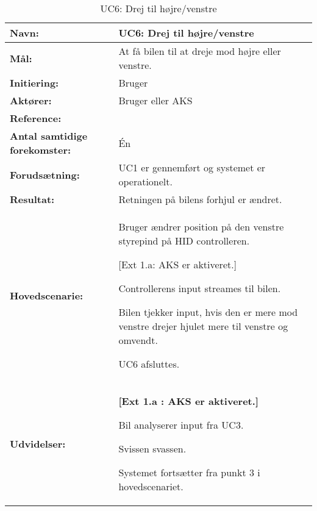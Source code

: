 \begin{table}[h]
\begin{tabularx}{\textwidth}{| L{3.3 cm} | Z |} \hline

\textbf{Navn:} 						& UC6: Drej til højre/venstre\\ \hline
\textbf{Mål:}						& At få bilen til at dreje mod højre eller venstre. \\ \hline
\textbf{Initiering:}				& Bruger \\ \hline
\textbf{Aktører:} 					& Bruger eller AKS \\ \hline
\textbf{Reference:} 				& \\ \hline
\textbf{Antal samtidige forekomster:} & Én \\ \hline
\textbf{Forudsætning:} 				& UC1 er gennemført og systemet er operationelt. \\ \hline
\textbf{Resultat:}					& Retningen på bilens forhjul er ændret. \\ \hline
\textbf{Hovedscenarie:}				& 

\begin{packed_enum}
\item Bruger ændrer position på den venstre styrepind på HID controlleren.
	\begin{packed_item}\itemsep1pt \parskip0pt 
	\item {[}Ext 1.a: AKS er aktiveret.{]}
	\end{packed_item}
\item Controllerens input streames til bilen.
\item Bilen tjekker input, hvis den er mere mod venstre drejer hjulet mere til venstre og omvendt. %
\item UC6 afsluttes.
\end{packed_enum} \\ \hline
\textbf{Udvidelser:}				&  
\textbf{{[}Ext 1.a : AKS er aktiveret.{]}}
	\begin{packed_enum}\itemsep1pt \parskip0pt 
		\item Bil analyserer input fra UC3. %
		\item Svissen svassen.
		\item Systemet fortsætter fra punkt 3 i hovedscenariet.
	\end{packed_enum}
\\ \hline
\end{tabularx}
\caption{UC6: Drej til højre/venstre}
\label{tbl:UC6}
\end{table}